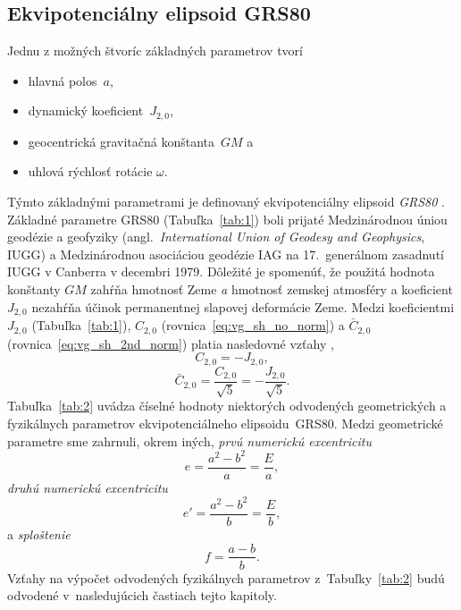 \documentclass[a4paper,12pt]{book}
\begin{document}
\subsection{Ekvipotenciálny elipsoid GRS80}
\label{sec:grs80}

Jednu z možných štvoríc základných parametrov tvorí
%
\begin{itemize}
\item hlavná polos~$a$,
%
\item dynamický koeficient~$J_{2,0}$,
%
\item geocentrická gravitačná konštanta~$GM$ a
%
\item uhlová rýchlosť rotácie $\omega$.
\end{itemize}
%
Týmto základnými parametrami je definovaný ekvipotenciálny elipsoid 
\emph{GRS80} \parencite[angl. \textit{Geodetic Reference 
System~1980};][]{GRS80}.  Základné parametre GRS80 (Tabuľka~\ref{tab:1}) boli 
prijaté Medzinárodnou úniou geodézie a geofyziky (angl.~\textit{International 
Union of Geodesy and Geophysics}, IUGG) a Medzinárodnou asociáciou geodézie IAG 
na 17.~generálnom zasadnutí IUGG v Canberra v decembri 1979.  Dôležité je 
spomenúť, že použitá hodnota konštanty $GM$ zahŕňa hmotnosť Zeme \emph{a} 
hmotnosť zemskej atmosféry a koeficient $J_{2,0}$ nezahŕňa účinok permanentnej 
slapovej deformácie Zeme.  Medzi koeficientmi $J_{2,0}$ (Tabuľka~\ref{tab:1}), 
$C_{2,0}$ (rovnica~\ref{eq:vg_sh_no_norm}) a $\bar{C}_{2,0}$ 
(rovnica~\ref{eq:vg_sh_2nd_norm}) platia nasledovné vzťahy 
\parencite{Moritz1967,MoritzPhysicalGeodesy},
%
\begin{equation}
C_{2,0} = -J_{2,0}{,}
\end{equation}
%
\begin{equation}
\bar{C}_{2,0} = \frac{C_{2,0}}{\sqrt{5}} = -\frac{J_{2,0}}{\sqrt{5}}{.}
\end{equation}
%
Tabuľka~\ref{tab:2} uvádza číselné hodnoty niektorých odvodených geometrických 
a fyzikálnych parametrov ekvipotenciálneho elipsoidu~GRS80.  Medzi geometrické 
parametre sme zahrnuli, okrem iných, \emph{prvú numerickú excentricitu}
%
\begin{equation}
\label{eq:1st_eccentricity}
e = \frac{a^2 - b^2}{a} = \frac{E}{a}{,}
\end{equation}
%
\emph{druhú numerickú excentricitu}
%
\begin{equation}
\label{eq:2nd_eccentricity}
e' = \frac{a^2 - b^2}{b} = \frac{E}{b}{,}
\end{equation}
%
a \emph{sploštenie}
%
\begin{equation}
\label{eq:flattening}
f = \frac{a - b}{b}{.}
\end{equation}
%
Vzťahy na výpočet odvodených fyzikálnych parametrov z~Tabuľky~\ref{tab:2} budú 
odvodené v~nasledujúcich častiach tejto kapitoly.
\end{document}
